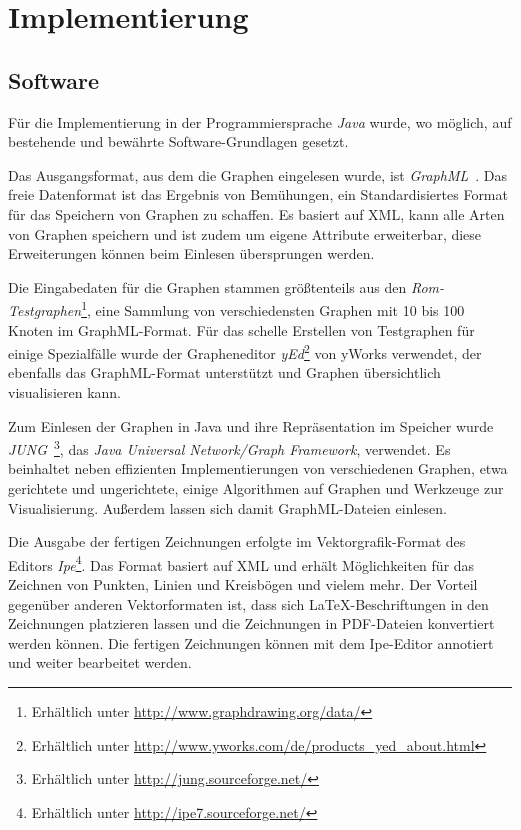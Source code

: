 \documentclass[a4paper]{scrreprt}
\theoremstyle{definition}
\begin{document}
\chapter{Implementierung}

\section{Software}

Für die Implementierung in der Programmiersprache \emph{Java} wurde, wo möglich, auf bestehende und bewährte Software-Grundlagen gesetzt.

Das Ausgangsformat, aus dem die Graphen eingelesen wurde, ist \emph{GraphML}~\cite{brandes+al-14}. Das freie Datenformat ist das Ergebnis von Bemühungen, ein Standardisiertes Format für das Speichern von Graphen zu schaffen. Es basiert auf XML, kann alle Arten von Graphen speichern und ist zudem um eigene Attribute erweiterbar, diese Erweiterungen können beim Einlesen übersprungen werden.

Die Eingabedaten für die Graphen stammen größtenteils aus den \emph{Rom-Testgraphen}\footnote{Erhältlich unter \url{http://www.graphdrawing.org/data/}}, eine Sammlung von verschiedensten Graphen mit 10 bis 100 Knoten im GraphML-Format. Für das schelle Erstellen von Testgraphen für einige Spezialfälle wurde der Grapheneditor \emph{yEd}\footnote{Erhältlich unter \url{http://www.yworks.com/de/products_yed_about.html}} von yWorks verwendet, der ebenfalls das GraphML-Format unterstützt und Graphen übersichtlich visualisieren kann.

Zum Einlesen der Graphen in Java und ihre Repräsentation im Speicher wurde \emph{JUNG}~\cite{jung}\footnote{Erhältlich unter \url{http://jung.sourceforge.net/}}, das \emph{Java Universal Network/Graph Framework}, verwendet. Es beinhaltet neben effizienten Implementierungen von verschiedenen Graphen, etwa gerichtete und ungerichtete, einige Algorithmen auf Graphen und Werkzeuge zur Visualisierung. Außerdem lassen sich damit GraphML-Dateien einlesen.

Die Ausgabe der fertigen Zeichnungen erfolgte im Vektorgrafik-Format des Editors \emph{Ipe}\footnote{Erhältlich unter \url{http://ipe7.sourceforge.net/}}. Das Format basiert auf XML und erhält Möglichkeiten für das Zeichnen von Punkten, Linien und Kreisbögen und vielem mehr. Der Vorteil gegenüber anderen Vektorformaten ist, dass sich \LaTeX-Beschriftungen in den Zeichnungen platzieren lassen und die Zeichnungen in PDF-Dateien konvertiert werden können. Die fertigen Zeichnungen können mit dem Ipe-Editor annotiert und weiter bearbeitet werden.
\end{document}
